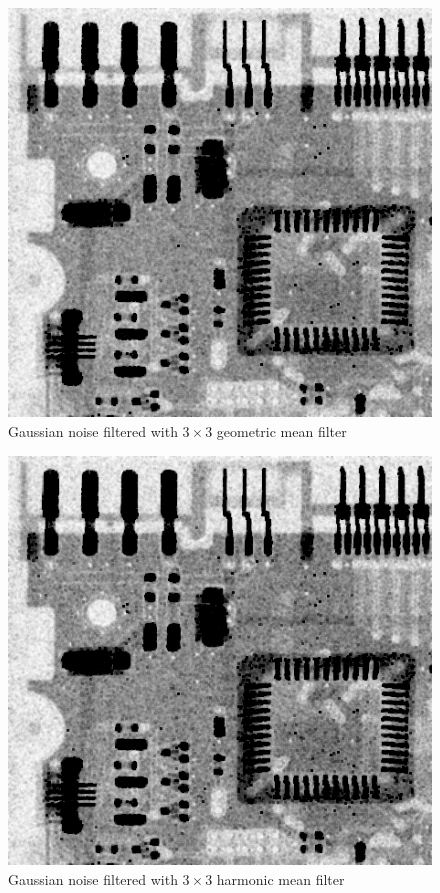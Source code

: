 \documentclass{article}
\begin{document}
\begin{figure}[H]
	\centering
	\includegraphics[width=336pt]{../result/task2/gauss/gauss-geometric.png}
	\caption{Gaussian noise filtered with $3 \times 3$ geometric mean filter}
	\label{fig:gaussgm}
\end{figure}

\begin{figure}[H]
	\centering
	\includegraphics[width=336pt]{../result/task2/gauss/gauss-harmonic.png}
	\caption{Gaussian noise filtered with $3 \times 3$ harmonic mean filter}
	\label{fig:gausshm}
\end{figure}
\end{document}
